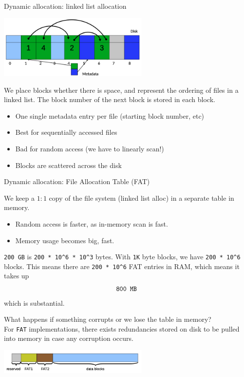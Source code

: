 \documentclass[journal, letterpaper]{IEEEtran}
\begin{document}
\begin{theory}{Dynamic allocation: linked list allocation}
    \begin{center}
        \includegraphics[width=7.5cm]{./photos/linked_list_alloc.png}
    \end{center}
    We place blocks whether there is space, and represent the ordering of files in a linked list. The block number of the next block is stored in each block.
    \begin{itemize}
        \item[\ding{51}] One single metadata entry per file (starting block number, etc)
        \item[\ding{51}] Best for sequentially accessed files
        \item[\ding{55}] Bad for random access (we have to linearly scan!)
        \item[\ding{55}] Blocks are scattered across the disk  
    \end{itemize}
\end{theory}
\begin{theory}{Dynamic allocation: File Allocation Table (FAT)}

    We keep a $1:1$ copy of the file system (linked list alloc) in a separate table in memory.
    \begin{itemize}
        \item[\ding{51}] Random access is faster, as in-memory scan is fast.
        \item[\ding{55}] Memory usage becomes big, fast. 
    \end{itemize}
    \verb|200 GB| is \verb|200 * 10^6 * 10^3| bytes. With \verb|1K| byte blocks, we have \verb|200 * 10^6| blocks. This means there are \verb|200 * 10^6| FAT entries in RAM, which means it takes up
    $$ \verb|800 MB|$$
    which is substantial.
\end{theory}
\begin{aside}{What happens if something corrupts or we lose the table in memory?} \\
    For \verb|FAT| implementations, there exists redundancies stored on disk to be pulled into memory in case any corruption occurs.
    \begin{center}
        \includegraphics[width=7.5cm]{./photos/fat_redundancy.png}
    \end{center}
\end{aside}
\end{document}

